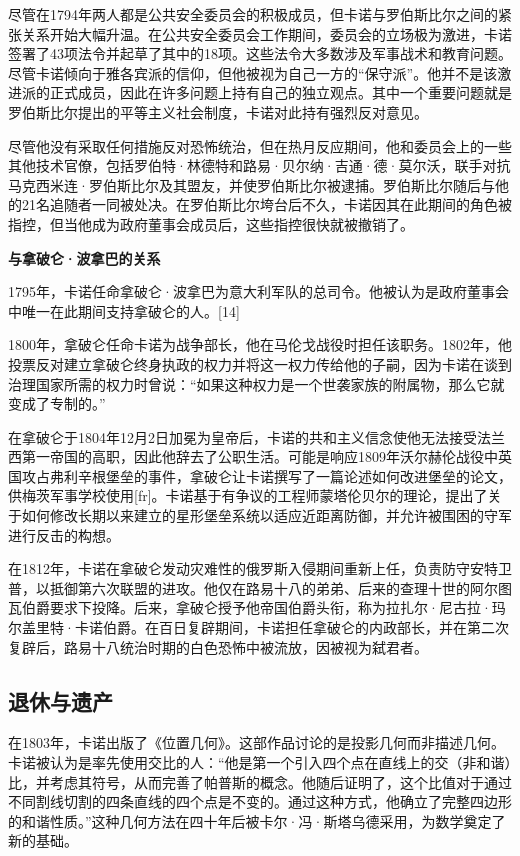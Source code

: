 尽管在1794年两人都是公共安全委员会的积极成员，但卡诺与罗伯斯比尔之间的紧张关系开始大幅升温。在公共安全委员会工作期间，委员会的立场极为激进，卡诺签署了43项法令并起草了其中的18项。这些法令大多数涉及军事战术和教育问题。尽管卡诺倾向于雅各宾派的信仰，但他被视为自己一方的“保守派”。他并不是该激进派的正式成员，因此在许多问题上持有自己的独立观点。其中一个重要问题就是罗伯斯比尔提出的平等主义社会制度，卡诺对此持有强烈反对意见。

尽管他没有采取任何措施反对恐怖统治，但在热月反应期间，他和委员会上的一些其他技术官僚，包括罗伯特·林德特和路易·贝尔纳·吉通·德·莫尔沃，联手对抗马克西米连·罗伯斯比尔及其盟友，并使罗伯斯比尔被逮捕。罗伯斯比尔随后与他的21名追随者一同被处决。在罗伯斯比尔垮台后不久，卡诺因其在此期间的角色被指控，但当他成为政府董事会成员后，这些指控很快就被撤销了。

\textbf{与拿破仑·波拿巴的关系}  

1795年，卡诺任命拿破仑·波拿巴为意大利军队的总司令。他被认为是政府董事会中唯一在此期间支持拿破仑的人。[14]  

1800年，拿破仑任命卡诺为战争部长，他在马伦戈战役时担任该职务。1802年，他投票反对建立拿破仑终身执政的权力并将这一权力传给他的子嗣，因为卡诺在谈到治理国家所需的权力时曾说：“如果这种权力是一个世袭家族的附属物，那么它就变成了专制的。”

在拿破仑于1804年12月2日加冕为皇帝后，卡诺的共和主义信念使他无法接受法兰西第一帝国的高职，因此他辞去了公职生活。可能是响应1809年沃尔赫伦战役中英国攻占弗利辛根堡垒的事件，拿破仑让卡诺撰写了一篇论述如何改进堡垒的论文，供梅茨军事学校使用[fr]。卡诺基于有争议的工程师蒙塔伦贝尔的理论，提出了关于如何修改长期以来建立的星形堡垒系统以适应近距离防御，并允许被围困的守军进行反击的构想。

在1812年，卡诺在拿破仑发动灾难性的俄罗斯入侵期间重新上任，负责防守安特卫普，以抵御第六次联盟的进攻。他仅在路易十八的弟弟、后来的查理十世的阿尔图瓦伯爵要求下投降。后来，拿破仑授予他帝国伯爵头衔，称为拉扎尔·尼古拉·玛尔盖里特·卡诺伯爵。在百日复辟期间，卡诺担任拿破仑的内政部长，并在第二次复辟后，路易十八统治时期的白色恐怖中被流放，因被视为弑君者。
\subsection{退休与遗产}
在1803年，卡诺出版了《位置几何》。这部作品讨论的是投影几何而非描述几何。卡诺被认为是率先使用交比的人：“他是第一个引入四个点在直线上的交（非和谐）比，并考虑其符号，从而完善了帕普斯的概念。他随后证明了，这个比值对于通过不同割线切割的四条直线的四个点是不变的。通过这种方式，他确立了完整四边形的和谐性质。”这种几何方法在四十年后被卡尔·冯·斯塔乌德采用，为数学奠定了新的基础。


